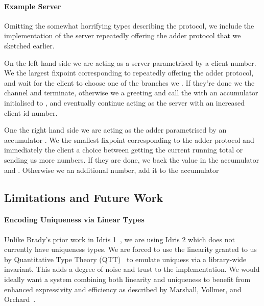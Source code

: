 \documentclass{easychair}
\begin{document}
\paragraph{Example Server} Omitting the somewhat horrifying types
describing the protocol, we include the implementation of the server
repeatedly offering the adder protocol that we sketched earlier.

\noindent\begin{minipage}[t]{.5\textwidth}
\end{minipage}\hfill
\begin{minipage}[t]{.45\textwidth}
\end{minipage}

On the left hand side we are acting as a server parametrised by a client
 number. We  the largest fixpoint
corresponding to repeatedly offering the adder protocol, and wait for
the client to choose one of the branches we .
If they're done we  the channel and terminate,
otherwise we  a greeting and call the
 with an accumulator initialised to ,
and eventually continue acting as the server with an increased client id number.

One the right hand side we are acting as the adder parametrised by an
accumulator . We  the smallest
fixpoint corresponding to the adder protocol and immediately
 the client a choice between getting the current
running total or sending us more numbers.
%
If they are done, we  back the value in the accumulator
and .
%
Otherwise we  an additional number, add it to the accumulator

\subsection*{Limitations and Future Work}

\paragraph{Encoding Uniqueness via Linear Types}
Unlike Brady's prior work in Idris 1~\cite{DBLP:journals/aghcs/Brady17},
we are using Idris 2 which does not currently have uniqueness types.
We are forced to use the linearity granted to us by
Quantitative Type Theory (QTT)~\cite{DBLP:conf/birthday/McBride16,DBLP:conf/lics/Atkey18}
to emulate uniquess via a library-wide invariant.
%
This adds a degree of noise and trust to the implementation.
We would ideally want a system combining both linearity and uniqueness
to benefit from enhanced expressivity and efficiency as described
by Marshall, Vollmer, and Orchard~\cite{DBLP:conf/esop/MarshallVO22}.
\end{document}
